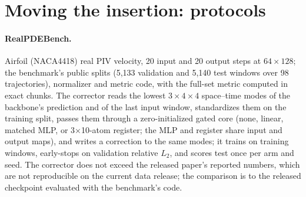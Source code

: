\documentclass{article}
\begin{document}
\section{Moving the insertion: protocols}
\label{app:move}

\paragraph{RealPDEBench.} Airfoil (NACA4418) real PIV velocity, 20 input and 20 output steps at $64\times128$; the
benchmark's public splits (5{,}133 validation and 5{,}140 test windows over 98 trajectories), normalizer and metric
code, with the full-set metric computed in exact chunks. The corrector reads the lowest $3\times4\times4$ space--time
modes of the backbone's prediction and of the last input window, standardizes them on the training split, passes them
through a zero-initialized gated core (none, linear, matched MLP, or 3$\times$10-atom register; the MLP and register
share input and output maps), and writes a correction to the same modes; it trains on training windows, early-stops
on validation relative $L_2$, and scores test once per arm and seed. The corrector does not exceed the released paper's
reported numbers, which are not reproducible on the current data release; the comparison is to the released checkpoint
evaluated with the benchmark's code.
\end{document}
